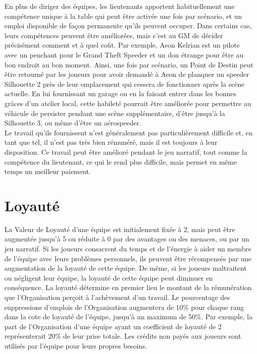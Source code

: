 \documentclass{article}
\begin{document}
En plus de diriger des équipes, les lieutenants apportent habituellement une compétence unique à la table qui peut être activée une fois par scénario, et un emploi disponible de façon permanente qu'ils peuvent occuper. Dans certains cas, leurs compétences peuvent être améliorées, mais c'est au GM de décider précisément comment et à quel coût. Par exemple, Aeon Kelrian est un pilote avec un penchant pour le Grand Theft Speeder et un don étrange pour être au bon endroit au bon moment. Ainsi, une fois par scénario, un Point de Destin peut être retourné par les joueurs pour avoir demandé à Aeon de planquer un speeder Silhouette 2 près de leur emplacement qui cessera de fonctionner après la scène actuelle. En lui fournissant un garage ou en la faisant entrer dans les bonnes grâces d'un atelier local, cette habileté pourrait être améliorée pour permettre au véhicule de persister pendant une scène supplémentaire, d'être jusqu'à la Silhouette 3, ou même d'être un aérospeeder.\\

Le travail qu'ils fournissent n'est généralement pas particulièrement difficile et, en tant que tel, il n'est pas très bien rémunéré, mais il est toujours à leur disposition. Ce travail peut être amélioré pendant le jeu narratif, tout comme la compétence du lieutenant, ce qui le rend plus difficile, mais permet en même temps un meilleur paiement.

\section*{Loyauté}
La Valeur de Loyauté d'une équipe est initialement fixée à 2, mais peut être augmentée jusqu'à 5 ou réduite à 0 par des avantages ou des menaces, ou par un jeu narratif. Si les joueurs consacrent du temps et de l'énergie à aider un membre de l'équipe avec leurs problèmes personnels, ils peuvent être récompensés par une augmentation de la loyauté de cette équipe. De même, si les joueurs maltraitent ou négligent leur équipe, la loyauté de cette équipe peut diminuer en conséquence. La loyauté détermine en premier lieu le montant de la rémunération que l'Organisation perçoit à l'achèvement d'un travail. Le pourcentage des suppressions d'emplois de l'Organisation augmentera de 10\% pour chaque rang dans la cote de loyauté de l'équipe, jusqu'à un maximum de 50\%. Par exemple, la part de l'Organisation d'une équipe ayant un coefficient de loyauté de 2 représenterait 20\% de leur prise totale. Les crédits non payés aux joueurs sont utilisés par l'équipe pour leurs propres besoins.\\
\end{document}
